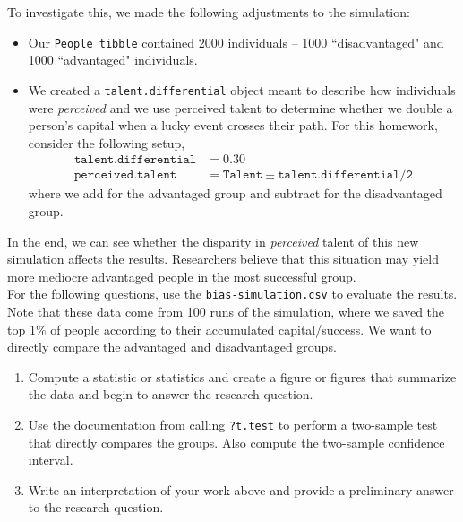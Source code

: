 \documentclass{article}\usepackage[]{graphicx}\usepackage[]{xcolor}
\begin{document}
\begin{enumerate}
To investigate this, we made the following adjustments to the simulation:
\begin{itemize}
\item Our \texttt{People tibble} contained 2000 individuals -- 1000 ``disadvantaged" and 1000 ``advantaged" individuals.
\item We created a \texttt{talent.differential} object meant to describe how individuals were \emph{perceived} and we use perceived talent to determine whether we double a person's capital when a lucky event crosses their path. For this homework, consider the following setup,
\begin{align*}
\texttt{talent.differential} &= 0.30 \\
\texttt{perceived.talent}   &= \texttt{Talent} \pm \texttt{talent.differential/2}
\end{align*}
where we add for the advantaged group and subtract for the disadvantaged group.
\end{itemize}

In the end, we can see whether the disparity in \emph{perceived} talent of this new simulation affects the results. Researchers believe that this situation may yield more mediocre advantaged people in the most successful group.\\

For the following questions, use the \texttt{bias-simulation.csv} to evaluate the results. Note that these data come from 100 runs of the simulation, where we saved the top 1\% of people according to their accumulated capital/success. We want to directly compare the advantaged and disadvantaged groups.
\begin{enumerate}
\item Compute a statistic or statistics and create a figure or figures that summarize the data and begin to answer the research question.
\item Use the documentation from calling \texttt{?t.test} to perform a two-sample test that directly compares the groups. Also compute the two-sample confidence interval.
\item Write an interpretation of your work above and provide a preliminary answer to the research question. 
\end{enumerate}
\end{enumerate}

\end{document}

